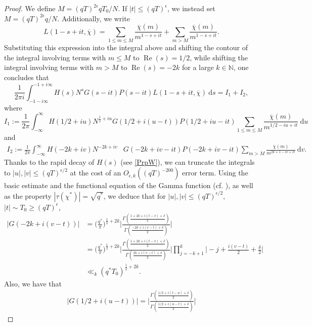 \documentclass[12pt]{amsart}
\theoremstyle{definition}
\theoremstyle{plain}
\theoremstyle{remark}
\numberwithin{equation}{section}
\numberwithin{theorem}{section}
\renewcommand{\Re}{\operatorname{Re}}
\numberwithin{equation}{section}
\begin{document}
\begin{proof}
		We define $M=(qT)^{2\epsilon}qT_{0}/N$. If \( |t| \leq (qT)^{\epsilon} \), we instead set  $M=(qT)^{2\epsilon}q/N$. Additionally, we write
		\[L(1-s+it,\overline{\chi})=\sum_{1\leq m \leq M}\frac{\overline{\chi}(m)}{m^{1-s+it}}+\sum_{m> M}\frac{\overline{\chi}(m)}{m^{1-s+it}}.\]
		Substituting this expression into the integral above and shifting the contour of the integral involving terms with $m \leq M$ to $\Re (s)=1/2$, while shifting the integral involving terms with $m > M$ to $\Re (s)=-2k$ for a large $k \in \mathbb{N}$, one concludes that
		\begin{equation}\label{inti12}
			\frac{1}{2\pi i}\int_{-1-i\infty}^{-1+i\infty}H(s)N^{s}G(s-it)P(s-it)L(1-s+it, \overline{\chi})\:\mathrm{d}s=I_{1}+I_{2},
		\end{equation}
		where
		\begin{equation*}
			I_1:=\frac{1}{2\pi }\int_{-\infty}^{\infty}H(1/2+iu)N^{\frac{1}{2}+iu}G(1/2+i(u-t))P(1/2+iu-it)\sum_{1 \leq m \leq M}\frac{\overline{\chi}(m)}{m^{1/2-iu+it}}\:\mathrm{d}u
		\end{equation*}
		and 
		\begin{align*}
			I_{2}:=\frac{1}{2\pi }\int_{-\infty}^{\infty}H(-2k+iv)N^{-2k+iv}&G(-2k+iv-it)P(-2k+iv-it)\sum_{m > M}\frac{\overline{\chi}(m)}{m^{2k+1-iv+it}}\:\mathrm{d}v.
		\end{align*}
		Thanks to the rapid decay of $H(s)$ (see \eqref{PrpW}), we can truncate the integrals to $|u|, |v| \leq (qT)^{\epsilon/2}$ at the cost of an $O_{\epsilon, k}((qT)^{-200})$ error term. Using the basic estimate and the functional equation of the Gamma function (cf. \cite[Chapter 10]{DavenportBook}), as well as the property $|\tau(\chi^{*})|=\sqrt{q^{*}}$, we deduce that for $|u|, |v| \leq (qT)^{\epsilon/2}$, $|t|\sim T_{0}\geq (qT)^{\epsilon}$, 
		\begin{align*}
			|G(-2k+i(v-t))|&=\bigg(\frac{q^{*}}{\pi}\bigg)^{\frac{1}{2}+2k}\bigg|\frac{\Gamma(\frac{1+2k+i(t-v)+\delta}{2})}{\Gamma(\frac{-2k+i(v-t)+\delta}{2})}\bigg|
			\\
			&=\bigg(\frac{q^{*}}{\pi}\bigg)^{\frac{1}{2}+2k}\bigg|\frac{\Gamma(\frac{1+2k+i(t-v)+\delta}{2})}{\Gamma(\frac{2k+i(v-t)+\delta}{2})}\bigg|\prod_{j=-k+1}^{k}\bigg|-j+\frac{i(v-t)}{2}+\frac{\delta}{2}\bigg| \\
			&\ll_{k} (q^{*}T_{0})^{\frac{1}{2}+2k}.
		\end{align*}
		Also, we have that
		\begin{align*}
			|G(1/2+i(u-t))|
			=\bigg|\frac{\Gamma(\frac{1/2+i(t-u)+\delta}{2})}{\Gamma(\frac{1/2+i(u-t)+\delta}{2})}\bigg|

\end{align*}
\end{proof}
\end{document}

